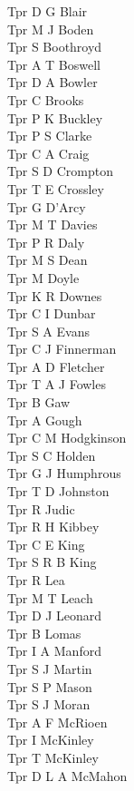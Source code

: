 \begin{multicols}{4}
  Tpr D G Blair \\
  Tpr M J Boden \\
  Tpr S Boothroyd \\
  Tpr A T Boswell \\
  Tpr D A Bowler \\
  Tpr C Brooks \\
  Tpr P K Buckley \\
  Tpr P S Clarke \\
  Tpr C A Craig \\
  Tpr S D Crompton \\
  Tpr T E Crossley \\
  Tpr G D'Arcy \\
  Tpr M T Davies \\
  Tpr P R Daly \\
  Tpr M S Dean \\
  Tpr M Doyle \\
  Tpr K R Downes \\
  Tpr C I Dunbar \\
  Tpr S A Evans \\
  Tpr C J Finnerman \\
  Tpr A D Fletcher \\
  Tpr T A J Fowles \\
  Tpr B Gaw \\
  Tpr A Gough \\
  Tpr C M Hodgkinson \\
  Tpr S C Holden \\
  Tpr G J Humphrous \\
  Tpr T D Johnston \\
  Tpr R Judic \\
  Tpr R H Kibbey \\
  Tpr C E King \\
  Tpr S R B King \\
  Tpr R Lea \\
  Tpr M T Leach \\
  Tpr D J Leonard \\
  Tpr B Lomas \\
  Tpr I A Manford \\
  Tpr S J Martin \\
  Tpr S P Mason \\
  Tpr S J Moran \\
  Tpr A F McRioen \\
  Tpr I McKinley \\
  Tpr T McKinley \\
  Tpr D L A McMahon \\

\end{multicols}
